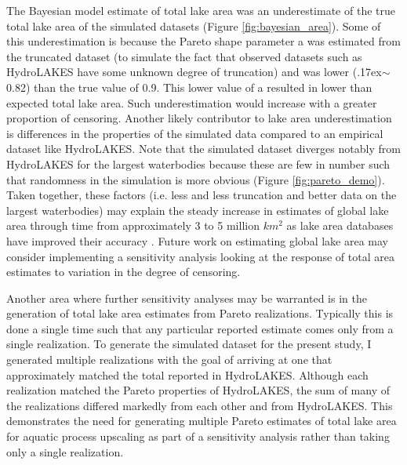 \documentclass{article}
\begin{document}
The Bayesian model estimate of total lake area was an underestimate of the true total lake area of the simulated datasets (Figure \ref{fig:bayesian_area}). Some of this underestimation is because the Pareto shape parameter a was estimated from the truncated dataset (to simulate the fact that observed datasets such as HydroLAKES have some unknown degree of truncation) and was lower ({\raise.17ex\hbox{$\scriptstyle\mathtt{\sim}$}}0.82) than the true value of 0.9. This lower value of a resulted in lower than expected total lake area. Such underestimation would increase with a greater proportion of censoring. Another likely contributor to lake area underestimation is differences in the properties of the simulated data compared to an empirical dataset like HydroLAKES. Note that the simulated dataset diverges notably from HydroLAKES for the largest waterbodies because these are few in number such that randomness in the simulation is more obvious (Figure \ref{fig:pareto_demo}). Taken together, these factors (i.e. less and less truncation and better data on the largest waterbodies) may explain the steady increase in estimates of global lake area through time from approximately 3 to 5 million $km^2$ as lake area databases have improved their accuracy \citep{downingGlobalAbundanceSize2006,lehnerDevelopmentValidationGlobal2004,verpoorterGlobalInventoryLakes2014}. Future work on estimating global lake area may consider implementing a sensitivity analysis looking at the response of total area estimates to variation in the degree of censoring.

Another area where further sensitivity analyses may be warranted is in the generation of total lake area estimates from Pareto realizations. Typically this is done a single time such that any particular reported estimate comes only from a single realization. To generate the simulated dataset for the present study, I generated multiple realizations with the goal of arriving at one that approximately matched the total reported in HydroLAKES. Although each realization matched the Pareto properties of HydroLAKES, the sum of many of the realizations differed markedly from each other and from HydroLAKES. This demonstrates the need for generating multiple Pareto estimates of total lake area for aquatic process upscaling as part of a sensitivity analysis rather than taking only a single realization.
\end{document}
